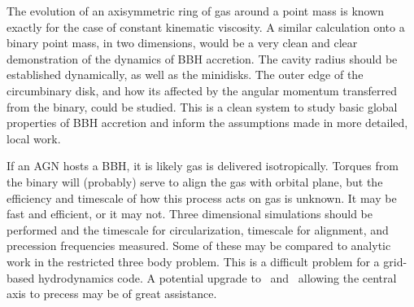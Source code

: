 The evolution of an axisymmetric ring of gas around a point mass is known exactly for the case of constant kinematic viscosity.  A similar calculation onto a binary point mass, in two dimensions, would be a very clean and clear demonstration of the dynamics of BBH accretion.  The cavity radius should be established dynamically, as well as the minidisks.  The outer edge of the circumbinary disk, and how its affected by the angular momentum transferred from the binary, could be studied.  This is a clean system to study basic global properties of BBH accretion and inform the assumptions made in more detailed, local work.

If an AGN hosts a BBH, it is likely gas is delivered isotropically.  Torques from the binary will (probably) serve to align the gas with orbital plane, but the efficiency and timescale of how this process acts on gas is unknown.  It may be fast and efficient, or it may not.  Three dimensional simulations should be performed and the timescale for circularization, timescale for alignment, and precession frequencies measured.  Some of these may be compared to analytic work in the restricted three body problem.  This is a difficult problem for a grid-based hydrodynamics code.  A potential upgrade to \disco\ and \grdisco\ allowing the central axis to precess may be of great assistance.

